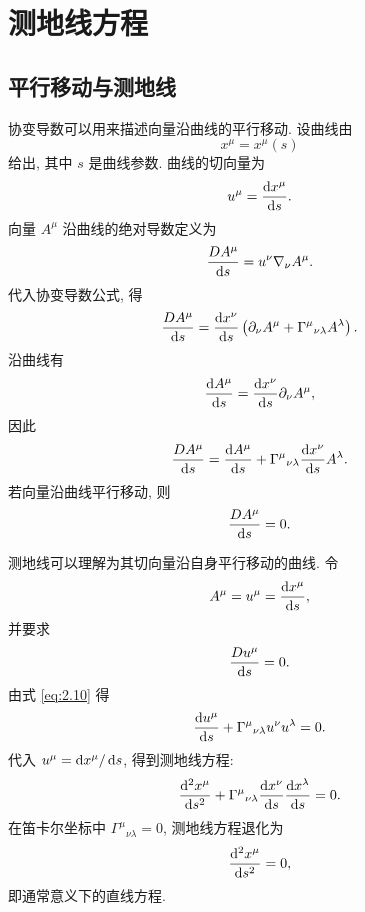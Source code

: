 \section{测地线方程}

\subsection{平行移动与测地线}

协变导数可以用来描述向量沿曲线的平行移动. 设曲线由
\[
x^{\mu}=x^{\mu}(s)
\]
给出, 其中 $s$ 是曲线参数. 曲线的切向量为
\[
u^{\mu}
=
\frac{\mathop{}\!\mathrm{d} x^{\mu}}{\mathop{}\!\mathrm{d} s}.
\]
向量 $A^{\mu}$ 沿曲线的绝对导数定义为
\[
\frac{D A^{\mu}}{\mathop{}\!\mathrm{d} s}
=
u^{\nu}\nabla_{\nu}A^{\mu}.
\]
代入协变导数公式, 得
\[
\frac{D A^{\mu}}{\mathop{}\!\mathrm{d} s}
=
\frac{\mathop{}\!\mathrm{d} x^{\nu}}{\mathop{}\!\mathrm{d} s}
\left(
\partial_{\nu}A^{\mu}
+
\Gamma^{\mu}{}_{\nu\lambda}A^{\lambda}
\right).
\]
沿曲线有
\[
\frac{\mathop{}\!\mathrm{d} A^{\mu}}{\mathop{}\!\mathrm{d} s}
=
\frac{\mathop{}\!\mathrm{d} x^{\nu}}{\mathop{}\!\mathrm{d} s}\partial_{\nu}A^{\mu},
\]
因此
\begin{equation}
	\frac{D A^{\mu}}{\mathop{}\!\mathrm{d} s}
	=
	\frac{\mathop{}\!\mathrm{d} A^{\mu}}{\mathop{}\!\mathrm{d} s}
	+
	\Gamma^{\mu}{}_{\nu\lambda}
	\frac{\mathop{}\!\mathrm{d} x^{\nu}}{\mathop{}\!\mathrm{d} s}
	A^{\lambda}.
	\label{eq:2.10}
\end{equation}
若向量沿曲线平行移动, 则
\[
\frac{D A^{\mu}}{\mathop{}\!\mathrm{d} s}=0.
\]

测地线可以理解为其切向量沿自身平行移动的曲线. 令
\[
A^{\mu}=u^{\mu}=\frac{\mathop{}\!\mathrm{d} x^{\mu}}{\mathop{}\!\mathrm{d} s},
\]
并要求
\[
\frac{D u^{\mu}}{\mathop{}\!\mathrm{d} s}=0.
\]
由式 \eqref{eq:2.10} 得
\[
\frac{\mathop{}\!\mathrm{d} u^{\mu}}{\mathop{}\!\mathrm{d} s}
+
\Gamma^{\mu}{}_{\nu\lambda}u^{\nu}u^{\lambda}
=
0.
\]
代入 $u^{\mu}=\mathop{}\!\mathrm{d} x^{\mu}/\mathop{}\!\mathrm{d} s$, 得到测地线方程: 
\begin{equation}
	\frac{\mathop{}\!\mathrm{d}^{2}x^{\mu}}{\mathop{}\!\mathrm{d} s^{2}}
	+
	\Gamma^{\mu}{}_{\nu\lambda}
	\frac{\mathop{}\!\mathrm{d} x^{\nu}}{\mathop{}\!\mathrm{d} s}
	\frac{\mathop{}\!\mathrm{d} x^{\lambda}}{\mathop{}\!\mathrm{d} s}
	=
	0.
	\label{eq:2.11}
\end{equation}
在笛卡尔坐标中 $\Gamma^{\mu}{}_{\nu\lambda}=0$, 测地线方程退化为
\[
\frac{\mathop{}\!\mathrm{d}^{2}x^{\mu}}{\mathop{}\!\mathrm{d} s^{2}}=0,
\]
即通常意义下的直线方程. 

